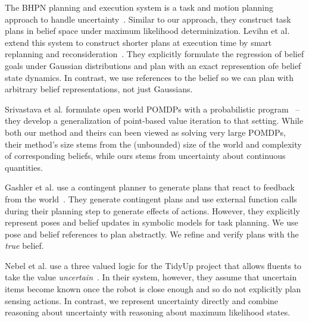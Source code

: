
The BHPN planning and execution system is a task and motion planning
approach to handle uncertainty~\cite{kaelbling2013integrated}. Similar
to our approach, they construct task plans in belief space under
maximum likelihood determinization. Levihn et al. extend this system
to construct shorter plans at execution time by smart replanning and
reconsideration~\cite{levihn2013foresight}. They explicitly formulate
the regression of belief goals under Gaussian distributions and plan
with an exact represention ofe belief state dynamics. In contrast, we
use references to the belief so we can plan with arbitrary belief
representations, not just Gaussians.

Srivastava et al. formulate open world POMDPs with a probabilistic
program~\cite{srivastava2014first} -- they develop a generalization of
point-based value iteration to that setting. While both our method and
theirs can been viewed as solving very large POMDPs, their method's size stems from
the (unbounded) size of the world and complexity of corresponding
beliefs, while ours stems from uncertainty about continuous quantities.


Gashler et al. use a contingent planner to generate plans that react
to feedback from the world~\cite{gaschler2013kvp}. They generate
contingent plans and use external function calls during their planning
step to generate effects of actions. However, they explicitly
represent poses and belief updates in symbolic models for task
planning. We use pose and belief references to plan abstractly. We
refine and verify plans with the \emph{true} belief.

Nebel et al. use a three valued logic for the TidyUp project that
allows fluents to take the value
\emph{uncertain}~\cite{nebel13aaaiirs}. In their system, however, they
assume that uncertain items become known once the robot is close
enough and so do not explicitly plan sensing actions. In contrast, we
represent uncertainty directly and combine
reasoning about uncertainty with reasoning about maximum likelihood
states.


